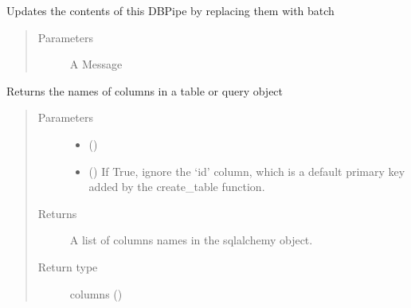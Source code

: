 \documentclass[letterpaper,10pt,english]{sphinxmanual}
\begin{document}
\begin{fulllineitems}

\begin{fulllineitems}
\label{\detokenize{Fireworks:Fireworks.extensions.database.DBPipe.update}}
Updates the contents of this DBPipe by replacing them with batch
\begin{quote}\begin{description}
\item[{Parameters}] \leavevmode
{} \textendash{} A Message

\end{description}\end{quote}

\end{fulllineitems}


\end{fulllineitems}


\begin{fulllineitems}
\label{\detokenize{Fireworks:Fireworks.extensions.database.parse_columns}}
Returns the names of columns in a table or query object
\begin{quote}\begin{description}
\item[{Parameters}] \leavevmode\begin{itemize}
\item {} 
 () \textendash{} 

\item {} 
 () \textendash{} If True, ignore the ‘id’ column, which is a default primary key
added by the create\_table function.

\end{itemize}

\item[{Returns}] \leavevmode
A list of columns names in the sqlalchemy object.

\item[{Return type}] \leavevmode
columns ()

\end{description}\end{quote}

\end{fulllineitems}
\end{document}

